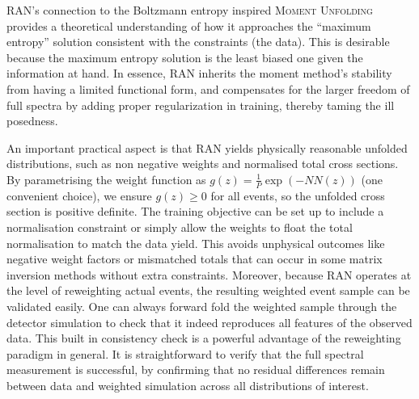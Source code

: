{{        RAN's connection to the Boltzmann entropy inspired \textsc{Moment Unfolding} provides a theoretical understanding of how it approaches the ``maximum entropy'' solution consistent with the constraints (the data).
        This is desirable because the maximum entropy solution is the least biased one given the information at hand.
        In essence, RAN inherits the moment method's stability from having a limited functional form, and compensates for the larger freedom of full spectra by adding proper regularization in training, thereby taming the ill posedness.

        An important practical aspect is that RAN yields physically reasonable unfolded distributions, such as non negative weights and normalised total cross sections.
        By parametrising the weight function as $g({z}) = \frac1P\exp(-NN({z}))$ (one convenient choice), we ensure $g({z})\ge 0$ for all events, so the unfolded cross section is positive definite.
        The training objective can be set up to include a normalisation constraint or simply allow the weights to float the total normalisation to match the data yield.
        This avoids unphysical outcomes like negative weight factors or mismatched totals that can occur in some matrix inversion methods without extra constraints.
        Moreover, because RAN operates at the level of reweighting actual events, the resulting weighted event sample can be validated easily.
        One can always forward fold the weighted sample through the detector simulation to check that it indeed reproduces all features of the observed data.
        This built in consistency check is a powerful advantage of the reweighting paradigm in general.
        It is straightforward to verify that the full spectral measurement is successful, by confirming that no residual differences remain between data and weighted simulation across all distributions of interest.

}}
